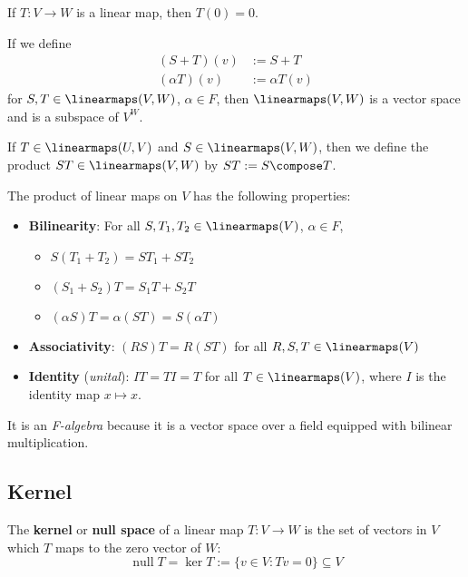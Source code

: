 \begin{lemma} If $T : V \to W$ is a linear map, then $T(0) = 0$.
\end{lemma}

\begin{theorem}
  If we define
  \begin{align*}
    (S + T)(v) &:= S + T \\ 
    (\alpha T)(v) &:= \alpha T(v)
  \end{align*}
  for $S, T \in \linearmaps(V,W)$, $\alpha \in F$, then $\linearmaps(V,W)$ is a vector space and is a subspace of $V^W$.
\end{theorem}

\begin{definition}
  If $T \in \linearmaps(U, V)$ and $S \in \linearmaps(V, W)$, then we define the product $ST \in \linearmaps(V, W)$ by $ST := S \compose T$.
\end{definition}

\begin{theorem}
  The product of linear maps on $V$ has the following properties:
  \begin{itemize}
    \item \textbf{Bilinearity}: For all $S, T_1, T_2 \in \linearmaps(V)$, $\alpha \in F$,
    \begin{itemize}
      \item $S(T_1 + T_2) = ST_1 + ST_2$
      \item $(S_1 + S_2)T = S_1 T + S_2 T$
      \item $(\alpha S)T = \alpha(ST) = S(\alpha T)$
    \end{itemize}
    \item \textbf{Associativity}: $(RS)T = R(ST)$ for all $R, S, T \in \linearmaps(V)$
    \item \textbf{Identity} (\textit{unital}): $IT = TI = T$ for all $T \in \linearmaps(V)$, where $I$ is the identity map $x \mapsto x$.
  \end{itemize}
  It is an \textit{F-algebra} because it is a vector space over a field equipped with bilinear multiplication.
\end{theorem}

\subsection{Kernel}

\begin{definition}[Kernel]
  The \textbf{kernel} or \textbf{null space} of a linear map $T : V \to W$ is the set of vectors in $V$ which $T$ maps to the zero vector of $W$:
  \[
    \operatorname{null} T = \ker T := \{ v \in V : Tv = 0 \} \subseteq V
  \]
\end{definition}

